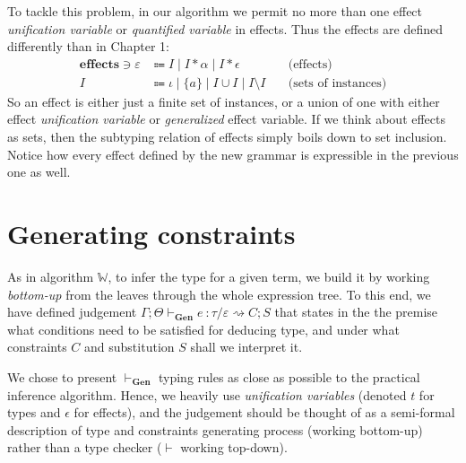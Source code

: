 \documentclass[declaration,shortabstract]{iithesis}
\theoremstyle{definition} \newtheorem{definition}{Definition}[section]
\newcommand{\gens}[6][\Gamma;\Theta]{\ensuremath{{{#1} \vdash_\textbf{Gen} {#2} \: : {#3}/{#4}} \rightsquigarrow {#5};{#6}}}
\begin{document}
To tackle this problem, in our algorithm we permit no more than one effect
\textit{unification variable} or \textit{quantified variable} in effects.
Thus the effects are defined differently than in Chapter 1:
\begin{align*} 
    \textbf{effects} \ni \varepsilon & \Coloneqq
    I \mid 
    I * \alpha \mid 
    I * \epsilon  &  \text{(effects)}
\\
    I & \Coloneqq \iota \mid \{a\} \mid I \cup I \mid I \setminus I
    \quad & \text{(sets of instances)}
\end{align*}
So an effect is either just a finite set of instances, or a union of one with either effect \textit{unification variable} or \textit{generalized} effect variable.
If we think about effects as sets,
then the subtyping relation of effects simply boils down to set inclusion.
Notice how every effect defined by the new grammar is expressible in the previous one as well.

\section{Generating constraints}
As in algorithm $\mathbb{W}$, to infer the type for a given term,
we build it by working \textit{bottom-up} from the leaves through the whole expression tree.
To this end, we have defined judgement $\gens{e}{\tau}{\varepsilon}{C}{S}$ that
states in the the premise what conditions need to be satisfied for deducing type, 
and under what constraints $C$ and substitution $S$ shall we interpret it.

We chose to present  $\vdash_\textbf{Gen}$ typing rules as close as possible
to the practical inference algorithm.
Hence, we heavily use \textit{unification variables}
(denoted $t$ for types and $\epsilon$ for effects),
and the judgement should be thought of as a semi-formal description of
type and constraints generating process (working bottom-up) rather than
a type checker ($\vdash$ working top-down).
\end{document}

